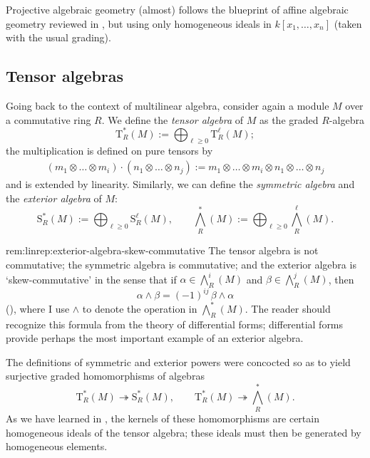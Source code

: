 Projective algebraic geometry (almost) follows the blueprint of affine
algebraic geometry reviewed in
, but using
only homogeneous ideals in $k[x_1, \dots, x_n]$ (taken with the usual
grading).

\subsection{Tensor algebras}
\label{subsec:linrep:tensor-algebras}
Going back to the context of multilinear algebra, consider again a
module $M$ over a commutative ring $R$. We define the \emph{tensor
  algebra} of $M$ as the graded $R$-algebra
\[
  \mathrm{T}^*_R(M) := \bigoplus_{\ell \geq 0} \mathrm{T}^\ell_R(M);
\]
the multiplication is defined on pure tensors by
\begin{align*}
  (m_1 \otimes \dots \otimes m_i) \cdot
  (n_1 \otimes \dots \otimes n_j)
  := m_1 \otimes \dots \otimes m_i \otimes n_1 \otimes \dots \otimes
  n_j
\end{align*}
and is extended by linearity. Similarly, we can define the
\emph{symmetric algebra} and the \emph{exterior algebra} of $M$:
\[
  \mathrm{S}^*_R(M) := \bigoplus_{\ell \geq 0} \mathrm{S}^\ell_R(M),
  \qquad \bigwedge^*_R(M) := \bigoplus_{\ell \geq 0}
  \bigwedge^\ell_R(M).
\]
\begin{rem}{}{rem:linrep:exterior-algebra-skew-commutative}
  The tensor algebra is not commutative; the symmetric algebra is
  commutative; and the exterior algebra is `skew-commutative' in the
  sense that if $\alpha \in \bigwedge^i_R(M)$ and
  $\beta \in \bigwedge^j_R(M)$, then
  \[
    \alpha \wedge \beta = (-1)^{ij}\, \beta \wedge \alpha
  \]
  (), where I
  use $\wedge$ to denote the operation in $\bigwedge^*_R(M)$. The
  reader should recognize this formula from the theory of differential
  forms; differential forms provide perhaps the most important example
  of an exterior algebra.
\end{rem}
The definitions of symmetric and exterior powers were concocted so as
to yield surjective graded homomorphisms of algebras
\[
  \mathrm{T}^*_R(M) \twoheadrightarrow \mathrm{S}^*_R(M), \qquad
  \mathrm{T}^*_R(M) \twoheadrightarrow \bigwedge^*_R(M).
\]
As we have learned in , the kernels of these
homomorphisms are certain homogeneous ideals of the tensor algebra;
these ideals must then be generated by homogeneous elements.

